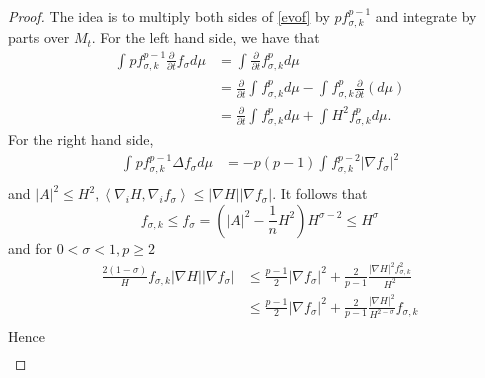 \begin{proof}
    The idea is to multiply both sides of \autoref{evof} by $p f_{\sigma ,k}^{p-1} $ and integrate by parts over $M_t$.
    For the left hand side, we have that 
    \begin{equation}
    \begin{split}
        \int_{}^{} p f_{\sigma ,k}^{p-1} \frac{\partial }{\partial t} f_{\sigma }^{} d \mu  
    &= \int_{}^{}\frac{\partial }{\partial t} f_{\sigma ,k}^{p} d \mu  \\
    &= \frac{\partial }{\partial t} \int_{}^{} f_{\sigma ,k}^{p} d \mu - \int_{}^{} f_{\sigma ,k}^{p} \frac{\partial }{\partial t} (d \mu) \\
    &= \frac{\partial }{\partial t} \int_{}^{} f_{\sigma ,k}^{p} d \mu + \int_{}^{}H^2 f_{\sigma ,k}^{p} d \mu . 
    \end{split}
    \end{equation}
    For the right hand side, 
    \begin{equation}
    \begin{split}
        \int_{}^{} p f_{\sigma ,k}^{p-1} \Delta f_{\sigma }^{} d \mu  
    &=  -p(p-1)\int_{}^{}f_{\sigma ,k}^{p-2} \left| \nabla f_{\sigma }^{}  \right| ^2\\
    \end{split}
    \end{equation} 
    and $ \left| A \right| ^2 \leq H^2, \left\langle \nabla _i H, \nabla_{i}^{} f_\sigma  \right\rangle \leq \left| \nabla H \right| \left| \nabla f_{\sigma }^{}  \right| .$ 
    It follows that 
    \[f_{\sigma ,k}^{} \leq f_{\sigma }^{} = \left( \left| A \right| ^2-\frac{1}{n}H^2 \right) H^{\sigma-2} \leq H^{\sigma } \]
    and for $0<\sigma <1, p \geq 2$ 
    \begin{equation}
    \begin{split}
        \frac{2(1-\sigma )}{H}f_{\sigma,k }^{} \left| \nabla H \right| \left| \nabla f_{\sigma }^{}  \right| 
    &\leq \frac{p-1}{2} \left| \nabla f_{\sigma }^{}  \right|^2 + \frac{2}{p-1} \frac{\left| \nabla H \right| ^2 f_{\sigma ,k}^{2} }{H^2}  \\
    & \leq \frac{p-1}{2} \left| \nabla f_{\sigma }^{}  \right|^2 + \frac{2}{p-1} \frac{\left| \nabla H \right| ^2 }{H^{2-\sigma }} f_{\sigma ,k}^{}   \\
    \end{split}
    \end{equation} 
    Hence
    \begin{equation}
        \begin{split}

\end{split}
\end{equation}
\end{proof}
